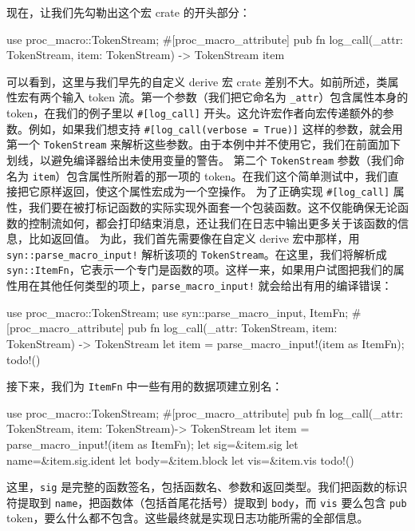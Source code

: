 现在，让我们先勾勒出这个宏 crate 的开头部分：
\begin{codebox}[rust]
use proc_macro::TokenStream;
#[proc_macro_attribute]
pub fn log_call(_attr: TokenStream, item: TokenStream) -> TokenStream {
  item
}
\end{codebox}
可以看到，这里与我们早先的自定义 derive 宏 crate 差别不大。如前所述，类属性宏有两个输入 token 流。第一个参数（我们把它命名为 \texttt{\_attr}）包含属性本身的 token，在我们的例子里以 \texttt{\#[\allowbreak{}log\_\allowbreak{}call]\allowbreak{}} 开头。这允许宏作者向宏传递额外的参数。例如，如果我们想支持 \texttt{\#[\allowbreak{}log\_\allowbreak{}call(\allowbreak{}verbose =\allowbreak{} True)\allowbreak{}]\allowbreak{}} 这样的参数，就会用第一个 \texttt{TokenStream} 来解析这些参数。由于本例中并不使用它，我们在前面加下划线，以避免编译器给出未使用变量的警告。
第二个 \texttt{TokenStream} 参数（我们命名为 \texttt{item}）包含属性所附着的那一项的 token。在我们这个简单测试中，我们直接把它原样返回，使这个属性宏成为一个空操作。
\label{idx:idx_ba0d99bd}
\label{idx:idx_df35f129}
为了正确实现 \texttt{\#[\allowbreak{}log\_\allowbreak{}call]\allowbreak{}} 属性，我们要在被打标记函数的实际实现外面套一个包装函数。这不仅能确保无论函数的控制流如何，都会打印结束消息，还让我们在日志中输出更多关于该函数的信息，比如返回值。
为此，我们首先需要像在自定义 derive 宏中那样，用 \texttt{syn::\allowbreak{}parse\_\allowbreak{}macro\_\allowbreak{}input!} 解析该项的 \texttt{TokenStream}。在这里，我们将解析成 \texttt{syn::ItemFn}，它表示一个专门是函数的项。这样一来，如果用户试图把我们的属性用在其他任何类型的项上，\texttt{parse\_\allowbreak{}macro\_\allowbreak{}input!} 就会给出有用的编译错误：
\begin{codebox}[rust]
use proc_macro::TokenStream;
use syn::{parse_macro_input, ItemFn};
#[proc_macro_attribute]
pub fn log_call(_attr: TokenStream, item: TokenStream) -> TokenStream {
    let item = parse_macro_input!(item as ItemFn);
    todo!()
}
\end{codebox}
接下来，我们为 \texttt{ItemFn} 中一些有用的数据项建立别名：
\begin{codebox}[rust]
use proc_macro::TokenStream;
#[proc_macro_attribute]
pub fn log_call(_attr: TokenStream, item: TokenStream)-> TokenStream {
    let item = parse_macro_input!(item as ItemFn);
    let sig=&item.sig
    let name=&item.sig.ident
    let body=&item.block
    let vis=&item.vis
    todo!()
}
\end{codebox}
这里，\texttt{sig} 是完整的函数签名，包括函数名、参数和返回类型。我们把函数的标识符提取到 \texttt{name}，把函数体（包括首尾花括号）提取到 \texttt{body}，而 \texttt{vis} 要么包含 \texttt{pub} token，要么什么都不包含。这些最终就是实现日志功能所需的全部信息。
